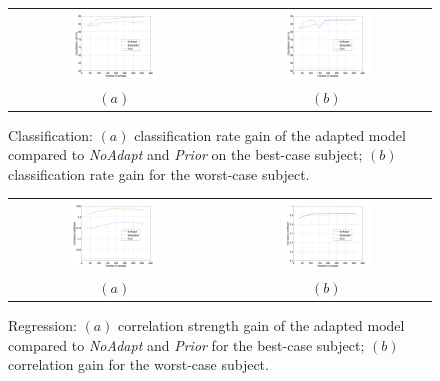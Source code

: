\begin{figure}[!ht] \centering
  \begin{tabular}{cc}
    \includegraphics[width=0.45\textwidth]{figs/exp1_abs_best} &
    \includegraphics[width=0.45\textwidth]{figs/exp1_abs_worst} \\
    $(a)$ & $(b)$ \\
  \end{tabular}
  \caption{Classification: $(a)$ classification rate gain
    of the adapted model compared to \emph{NoAdapt} and \emph{Prior}
    on the best-case subject; $(b)$ classification rate gain for
    the worst-case subject.}
  \label{fig:cla_abs}
\end{figure}

\begin{figure}[!ht] \centering
  \begin{tabular}{cc}
    \includegraphics[width=0.45\textwidth]{figs/exp2_abs_best} &
    \includegraphics[width=0.45\textwidth]{figs/exp2_abs_worst} \\
    $(a)$ & $(b)$ \\
  \end{tabular}
  \caption{Regression: $(a)$ correlation strength gain
    of the adapted model compared to \emph{NoAdapt} and \emph{Prior}
    for the best-case subject; $(b)$ correlation gain for
    the worst-case subject.}
  \label{fig:reg_abs}
\end{figure}

